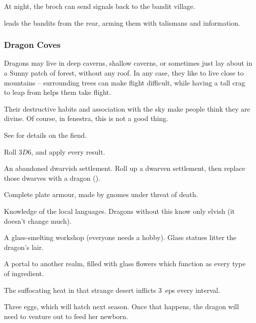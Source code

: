 \begin{multicols}{2}
\begin{dlist}
  At night, the \gls{broch} can send signals back to the bandit \gls{village}.
  \item
   leads the bandits from the rear, arming them with \glspl{talisman} and information.
\end{dlist}

\subsubsection{Dragon Coves}
\label{dragonPoint}

Dragons may live in deep caverns, shallow caverns, or sometimes just lay about in a Sunny patch of forest, without any roof.
In any case, they like to live close to mountains -- surrounding trees can make flight difficult, while having a tall crag to leap from helps them take flight.

Their destructive habits and association with the sky make people think they are divine.
Of course, in \gls{fenestra}, this is not a good thing.

See  for details on the fiend.

Roll $3D6$, and apply every result.

\begin{dlist}
  \item
  An abandoned dwarvish settlement.
  Roll up a dwarven settlement, then replace those dwarves with a dragon ().
  \item
  Complete plate armour, made by gnomes under threat of death.
  \iftoggle{core}{(See the core rules, \autopageref{bandingArmour}.)}{}
  \item
  Knowledge of the local languages.
  Dragons without this know only elvish (it doesn't change much).
  \item
  A glass-smelting workshop (everyone needs a hobby).
  Glass statues litter the dragon's lair.
  \item
  A portal to another realm, filled with glass flowers which function as every type of \gls{ingredient}.

  The suffocating heat in that strange desert inflicts 3~\glspl{ep} every \gls{interval}.
  \item
  Three eggs, which will hatch next season.
  Once that happens, the dragon will need to venture out to feed her newborn.
\end{dlist}


\end{multicols}
